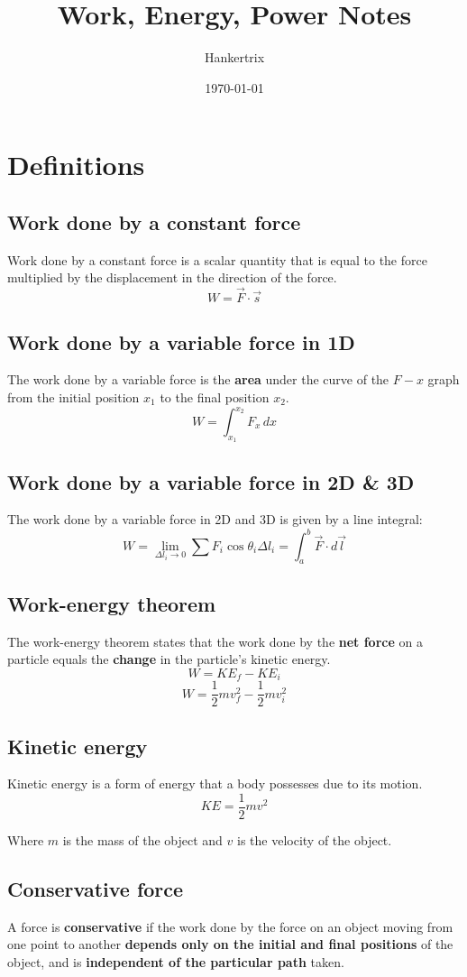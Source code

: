 \documentclass[11pt]{article}
\author{Hankertrix}
\date{\today}
\title{Work, Energy, Power Notes}
\begin{document}
\maketitle
\setcounter{tocdepth}{2}
\tableofcontents \clearpage\section{Definitions}
\label{sec:org60015fd}

\subsection{Work done by a constant force}
\label{sec:org75aa7fe}
Work done by a constant force is a scalar quantity that is equal to the force multiplied by the displacement in the direction of the force.
\[W = \vec{F} \cdot \vec{s}\]
\subsection{Work done by a variable force in 1D}
\label{sec:org8c7125d}
The work done by a variable force is the \textbf{area} under the curve of the \(F-x\) graph from the initial position \(x_1\) to the final position \(x_2\).
\[W = \int_{x_1}^{x_2} F_x \, dx\]
\subsection{Work done by a variable force in 2D \& 3D}
\label{sec:org1929723}
The work done by a variable force in 2D and 3D is given by a line integral:
\[W = \lim_{\Delta l_i \rightarrow 0} \sum F_i \cos \theta_i \Delta l_i = \int_a^b \vec{F} \cdot d \vec{l}\]
\subsection{Work-energy theorem}
\label{sec:org99ac45a}
The work-energy theorem states that the work done by the \textbf{net force} on a particle equals the \textbf{change} in the particle's kinetic energy.
\[W = KE_{f} - KE_{i}\]
\[W = \frac{1}{2} mv_f^2 - \frac{1}{2}mv_i^2\]
\subsection{Kinetic energy}
\label{sec:orgc2ad0dc}
Kinetic energy is a form of energy that a body possesses due to its motion.
\[KE = \frac{1}{2}mv^2\]

Where \(m\) is the mass of the object and \(v\) is the velocity of the object.
\subsection{Conservative force}
\label{sec:orgd7c7f86}
A force is \textbf{conservative} if the work done by the force on an object moving from one point to another \textbf{depends only on the initial and final positions} of the object, and is \textbf{independent of the particular path} taken.
\end{document}
